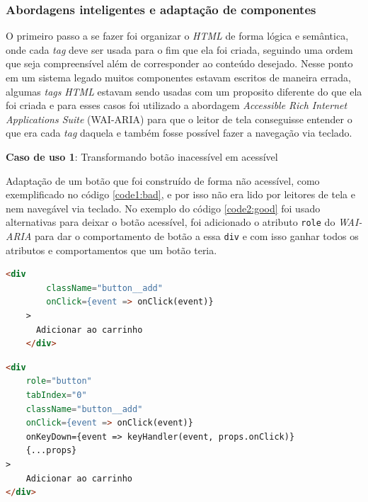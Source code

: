 \subsubsection{Abordagens inteligentes e adaptação de componentes}
{

O primeiro passo a se fazer foi organizar o \textit{HTML} de forma lógica e semântica, onde cada \textit{tag} deve ser usada para o fim que ela foi criada, seguindo uma ordem que seja compreensível além de corresponder ao conteúdo desejado. Nesse ponto em um sistema legado muitos componentes estavam escritos de maneira errada, algumas \textit{tags} \textit{HTML} estavam sendo usadas com um proposito diferente do que ela foi criada e para esses casos foi utilizado a abordagem \textit{Accessible Rich Internet Applications Suite} (WAI-ARIA) \cite{WAI-ARIA} para que o leitor de tela conseguisse entender o que era cada \textit{tag} daquela e também fosse possível fazer a navegação via teclado.

{\textbf{Caso de uso 1}: Transformando botão inacessível em acessível}

Adaptação de um botão que foi construído de forma não acessível, como exemplificado no código \ref{code1:bad},  e por isso não era lido por leitores de tela e nem navegável via teclado. No exemplo do código \ref{code2:good} foi usado alternativas para deixar o botão acessível, foi adicionado o atributo \lstinline{role} do \textit{WAI-ARIA}\cite{WAI-ARIA} para dar o comportamento de botão a essa \lstinline{div} e com isso ganhar todos os atributos e comportamentos que um botão teria.

\begin{lstlisting}[language=html,caption={Componente de botão antes de receber boas práticas de acessibilidade.},  label=code1:bad]
    <div
        className="button__add"
        onClick={event => onClick(event)}
    >
      Adicionar ao carrinho 
    </div>

\end{lstlisting}}
{\begin{lstlisting}[language=html,caption={Adaptação do componente de botão usando o atributo \textit{role} presente no \textit{WAI-ARIA} \cite{WAI-ARIA}.}, label=code2:good]
<div 
    role="button" 
    tabIndex="0" 
    className="button__add"
    onClick={event => onClick(event)}
    onKeyDown={event => keyHandler(event, props.onClick)}
    {...props}
>
    Adicionar ao carrinho
</div>
 
\end{lstlisting}}

